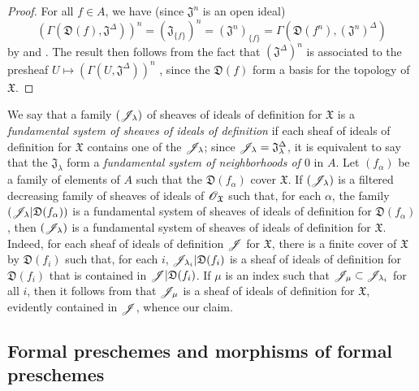 \begin{proof}
For all $f\in A$, we have (since $\mathfrak{J}^n$ is an open ideal)
\[
  (\Gamma(\mathfrak{D}(f),\mathfrak{J}^\Delta))^n=(\mathfrak{J}_{\{f\}})^n=(\mathfrak{J}^n)_{\{f\}}=\Gamma(\mathfrak{D}(f^n),(\mathfrak{J}^n)^\Delta)
\]
by  and .
The result then follows from the fact that $(\mathfrak{J}^\Delta)^n$ is associated to the presheaf $U\mapsto(\Gamma(U,\mathfrak{J}^\Delta))^n$ , since the $\mathfrak{D}(f)$ form a basis for the topology of $\mathfrak{X}$.
\end{proof}

\begin{env}[10.3.7]
\label{I.10.3.7}
We say that a family $(\mathscr{J}_\lambda)$ of sheaves of ideals of definition for $\mathfrak{X}$ is a \emph{fundamental system of sheaves of ideals of definition} if each sheaf of ideals of definition for $\mathfrak{X}$ contains one of the $\mathscr{J}_\lambda$; since $\mathscr{J}_\lambda=\mathfrak{J}_\lambda^\Delta$, it is equivalent to say that the $\mathfrak{J}_\lambda$ form a \emph{fundamental system of neighborhoods of $0$} in $A$.
Let $(f_\alpha)$ be a family of elements of $A$ such that the $\mathfrak{D}(f_\alpha)$ cover $\mathfrak{X}$.
If $(\mathscr{J}_\lambda)$ is a filtered decreasing family of sheaves of ideals of $\mathscr{O}_\mathfrak{X}$ such that, for each $\alpha$, the family $(\mathscr{J}_\lambda|\mathfrak{D}(f_\alpha))$ is a fundamental system of sheaves of ideals of definition for $\mathfrak{D}(f_\alpha)$, then $(\mathscr{J}_\lambda)$ is a fundamental system of sheaves of ideals of definition for $\mathfrak{X}$.
Indeed, for each sheaf of ideals of definition $\mathscr{J}$ for $\mathfrak{X}$, there is a finite cover of $\mathfrak{X}$ by $\mathfrak{D}(f_i)$ such that, for each $i$, $\mathscr{J}_{\lambda_i}|\mathfrak{D}(f_i)$ is a sheaf of ideals of definition for $\mathfrak{D}(f_i)$ that is contained in $\mathscr{J}|\mathfrak{D}(f_i)$.
If $\mu$ is an index such that $\mathscr{J}_\mu\subset\mathscr{J}_{\lambda_i}$ for all $i$, then it follows from  that $\mathscr{J}_\mu$ is a sheaf of ideals of definition for $\mathfrak{X}$, evidently contained in $\mathscr{J}$, whence our claim.
\end{env}

\subsection{Formal preschemes and morphisms of formal preschemes}
\label{subsection:I.10.4}

